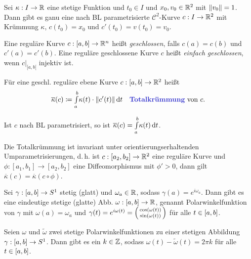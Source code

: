 \documentclass{cheat-sheet}
\newcommand{\Intabdt}[1]{\Int{a}{b}{#1}{t}}
\begin{document}
\begin{satz}
  Sei $\kappa : I \to \mathbb{R}$ eine stetige Funktion und $t_0 \in I$ und $x_0, v_0 \in \mathbb{R}^2$ mit $\lVert v_0\rVert = 1$. Dann gibt es ganu eine nach BL parametrisierte $\mathcal{C}^2$-Kurve $c : I \to \mathbb{R}^2$ mit Krümmung $\kappa$, $c(t_0) = x_0$ und $c'(t_0) = v(t_0) = v_0$.
\end{satz}

\begin{defn}
  Eine reguläre Kurve $c : \left[ a, b \right] \to \mathbb{R}^n$ heißt \emph{geschlossen}, falls $c(a) = c(b)$ und $c'(a) = c'(b)$.
  Eine reguläre geschlossene Kurve $c$ heißt \emph{einfach geschlossen}, wenn $c|_{[a, b[}$ injektiv ist.
\end{defn}

\begin{defn}
  Für eine geschl. reguläre ebene Kurve $c : \left[ a, b \right] \to \mathbb{R}^2$ heißt
  \[
    \overline{\kappa}(c) \coloneqq \Intabdt{\kappa(t) \cdot \norm{c'(t)}}
    \quad \text{\emph{Totalkrümmung} von $c$.}
  \]
\end{defn}

\begin{bem}
  Ist $c$ nach BL parametrisiert, so ist $\overline{\kappa}(c) = \Intabdt{\kappa(t)}$.
\end{bem}

\begin{satz}
  Die Totalkrümmung ist invariant unter orientierungserhaltenden Umparametrisierungen, d.\,h. ist $c : [a_2, b_2] \to \mathbb{R}^2$ eine reguläre Kurve und $\phi : [a_1, b_1] \to [a_2, b_2]$ eine Diffeomorphismus mit $\phi' > 0$, dann gilt $\overline\kappa(c) = \overline\kappa(c \circ \phi)$.
\end{satz}

\begin{satz}
  Sei $\gamma : \left[ a, b \right] \to S^1$ stetig (glatt) und $\omega_a \in \mathbb{R}$, sodass $\gamma(a) = e^{i \omega_a}$. Dann gibt es eine eindeutige stetige (glatte) Abb. $\omega : \left[ a, b \right] \to \mathbb{R}$, genannt Polarwinkelfunktion von $\gamma$ mit $\omega(a) = \omega_a$ und $\gamma(t) = e^{i \omega(t)} = \begin{psmallmatrix} \cos(\omega(t)) \\ \sin(\omega(t)) \end{psmallmatrix}$ für alle $t \in \left[ a, b \right]$.
\end{satz}

\begin{satz}
  Seien $\omega$ und $\tilde\omega$ zwei stetige Polarwinkelfunktionen zu einer stetigen Abbildung $\gamma : \left[ a, b \right] \to S^1$. Dann gibt es ein $k \in \mathbb{Z}$, sodass $\omega(t) - \tilde\omega(t) = 2 \pi k$ für alle $t \in \left[ a, b \right]$.
\end{satz}
\end{document}
